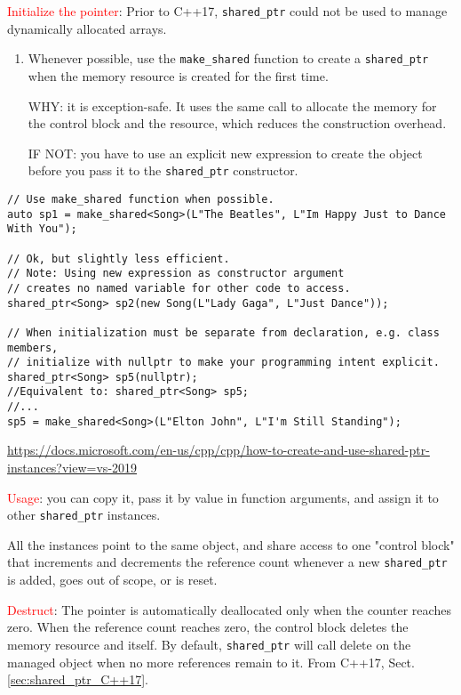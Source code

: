 \textcolor{red}{Initialize the pointer}: Prior to C++17, \verb!shared_ptr! could
not be used to manage dynamically allocated arrays.
\begin{enumerate}
  
  \item  Whenever possible, use the \verb!make_shared! function to create a
  \verb!shared_ptr! when the memory resource is created for the first time.
  
  WHY: it is  exception-safe. It uses the same call to allocate the memory for
  the control block and the resource, which reduces the construction overhead.
  
  IF NOT: you have to use an explicit new expression to create the object before
  you pass it to the \verb!shared_ptr! constructor.
  
\end{enumerate}
\begin{verbatim}
// Use make_shared function when possible.
auto sp1 = make_shared<Song>(L"The Beatles", L"Im Happy Just to Dance With You");

// Ok, but slightly less efficient. 
// Note: Using new expression as constructor argument
// creates no named variable for other code to access.
shared_ptr<Song> sp2(new Song(L"Lady Gaga", L"Just Dance"));

// When initialization must be separate from declaration, e.g. class members, 
// initialize with nullptr to make your programming intent explicit.
shared_ptr<Song> sp5(nullptr);
//Equivalent to: shared_ptr<Song> sp5;
//...
sp5 = make_shared<Song>(L"Elton John", L"I'm Still Standing");
\end{verbatim}
\url{https://docs.microsoft.com/en-us/cpp/cpp/how-to-create-and-use-shared-ptr-instances?view=vs-2019}

\textcolor{red}{Usage}: you can copy it, pass it by value in function arguments,
and assign it to other \verb!shared_ptr! instances.

All the instances point to the same object, and share access to one "control
block" that increments and decrements the reference count whenever a new
\verb!shared_ptr! is added, goes out of scope, or is reset.

\textcolor{red}{Destruct}: The pointer is automatically deallocated only when
the counter reaches zero. When the reference count reaches zero, the control
block deletes the memory resource and itself. By default, \verb!shared_ptr! will
call delete on the managed object when no more references remain to it. From
C++17, Sect.\ref{sec:shared_ptr_C++17}.




